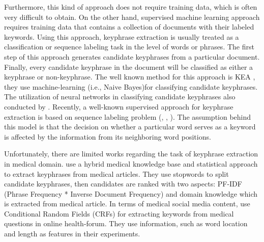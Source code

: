 Furthermore, this kind of approach does not require training data, which is often very difficult to obtain. On the other hand, supervised machine learning approach requires training data that contains a collection of documents with their labeled keywords. Using this approach, keyphrase extraction is usually treated as a classification or sequence labeling task in the level of words or phrases. The first step of this approach generates candidate keyphrases from a particular document. Finally, every candidate keyphrase in the document will be classified as either a keyphrase or non-keyphrase. The well known method for this approach is KEA \cite{witten1999kea}, they use machine-learning (i.e., Naive Bayes)for classifying candidate keyphrases. The utilization of neural networks in classifying candidate keyphrases also conducted by \cite{ekpNeuralNetworks}. Recently, a well-known supervised approach for keyphrase extraction is based on sequence labeling problem (\cite{zhang2008automatic}, \cite{cao2010automatically}, \cite{zhang2016keyphrase}). The assumption behind this model is that the decision on whether a particular word serves as a keyword is affected by the information from its neighboring word positions.

Unfortunately, there are limited works regarding the task of keyphrase extraction in medical domain. \cite{ekpMedicalDocumentHybrid} use a hybrid medical knowledge base and statistical approach to extract keyphrases from medical articles. They use stopwords to split candidate keyphrases, then candidates are ranked with two aspects: PF-IDF (Phrase Frequency * Inverse Document Frequency) and domain knowledge which is extracted from medical article. In terms of medical social media content, \cite{cao2010automatically} use Conditional Random Fields (CRFs) for extracting keywords from medical questions in online health-forum. They use information, such as word location and length as features in their experiments.

